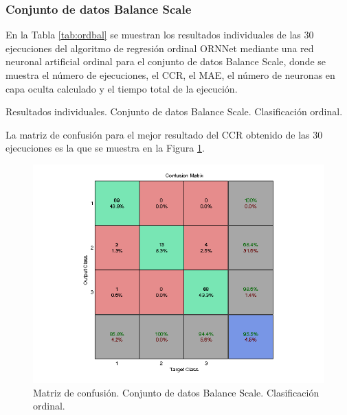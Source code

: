 			\subsubsection{Conjunto de datos Balance Scale}
			
			En la Tabla \ref{tab:ordbal} se muestran los resultados individuales de las 30 ejecuciones del algoritmo de regresión ordinal ORNNet mediante una red neuronal artificial ordinal para el conjunto de datos Balance Scale, donde se muestra el número de ejecuciones, el CCR, el MAE, el número de neuronas en capa oculta calculado y el tiempo total de la ejecución.\\
			
			\begin{table}[!htbp]
				\centering
				\caption{Resultados individuales. Conjunto de datos Balance Scale. Clasificación ordinal.}
				\label{tab:ordbal}
			\end{table}
			
			La matriz de confusión para el mejor resultado del CCR obtenido de las 30 ejecuciones es la que se muestra en la Figura \ref{fig:ordbal}.
			
			\begin{figure}[htbp]
				\centering
				\includegraphics[scale=0.8]{../src/results/ordinal/balance_mc1.png}
				\caption{Matriz de confusión. Conjunto de datos Balance Scale. Clasificación ordinal.}
				\label{fig:ordbal}
			\end{figure}
			

